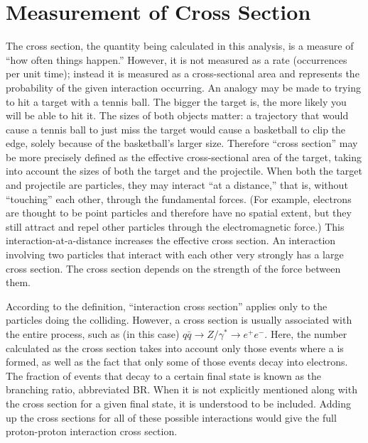 \section{Measurement of Cross Section}
\label{over:xsec}

The cross section, the quantity being calculated in this analysis, 
is a measure of ``how often things happen.''  
However, it is not measured as a rate (occurrences per unit time); 
instead it is measured as a cross-sectional area 
and represents the probability of the given interaction occurring.  
An analogy may be made to trying to hit a target with a tennis ball.  
The bigger the target is, the more likely you will be able to hit it.  
The sizes of both objects matter: 
a trajectory that would cause a tennis ball to just miss the target 
would cause a basketball to clip the edge, 
solely because of the basketball's larger size.  
Therefore ``cross section'' may be more precisely defined as the 
effective cross-sectional area of the target, 
taking into account the sizes of both the target and the projectile.  
When both the target and projectile are particles, %
they may interact ``at a distance,'' that is, without ``touching'' each other, 
through the fundamental forces.  
(For example, electrons are thought to be point particles 
and therefore have no spatial extent, 
but they still attract and repel other particles 
through the electromagnetic force.) 
This interaction-at-a-distance increases the effective cross section.  
An interaction involving two particles that 
interact with each other very strongly has a large cross section.  
The cross section depends on the strength of the force between them.  

According to the definition, ``interaction cross section'' applies only to 
the particles doing the colliding.  
However, a cross section is usually associated with the entire process, 
such as (in this case) 
$ q\bar{q} \rightarrow Z/ \gamma^{*} \rightarrow e^{+} e^{-} $.  %
Here, the number calculated as the cross section takes into account 
only those events where a \Zg is formed, 
as well as the fact that only some of those events decay into electrons.  
The fraction of events that decay to a certain final state is known as 
the branching ratio, abbreviated BR.  
When it is not explicitly mentioned along with the cross section 
for a given final state, it is understood to be included.  
Adding up the cross sections for all of these possible interactions 
would give the full proton-proton interaction cross section.  

